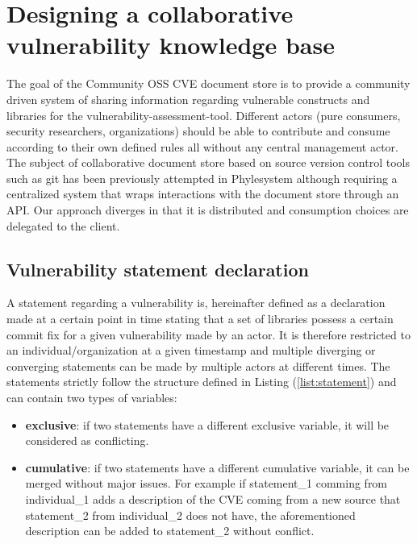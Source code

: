 \documentclass[11pt]{article}
\begin{document}
\section{Designing a collaborative vulnerability knowledge base} \label{sec:vulnkb}

\hspace{5mm} The goal of the Community OSS CVE document store is to provide a community driven system of sharing information regarding vulnerable constructs and libraries for the vulnerability-assessment-tool. Different actors (pure consumers, security researchers, organizations) should be able to contribute and consume according to their own defined rules all without any central management actor. The subject of collaborative document store based on source version control tools such as git has been previously attempted in Phylesystem \cite{10.1093/bioinformatics/btv276} although requiring a centralized system that wraps interactions with the document store through an API. Our approach diverges in that it is distributed and consumption choices are delegated to the client.  

\subsection{Vulnerability statement declaration}

A statement regarding a vulnerability is, hereinafter defined as a declaration made at a certain point in time stating that a set of libraries possess a certain commit fix for a given vulnerability made by an actor. It is therefore restricted to an individual/organization at a given timestamp and multiple diverging or converging statements can be made by multiple actors at different times. The statements strictly follow the structure defined in Listing (\ref{list:statement}) and can contain two types of variables:
\begin{itemize}
    \item \textbf{exclusive}: if two statements have a different exclusive variable, it will be considered as conflicting.
    \item \textbf{cumulative}: if two statements have a different cumulative variable, it can be merged without major issues. For example if statement\_1 comming from individual\_1 adds a description of the CVE coming from a new source that statement\_2 from individual\_2 does not have, the aforementioned description can be added to statement\_2 without conflict.
\end{itemize}
\end{document}
